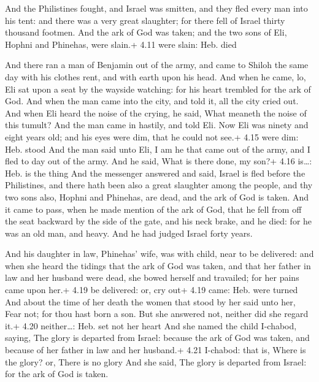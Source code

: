  And the Philistines fought, and Israel was smitten, and
they fled every man into his tent: and there was a very great slaughter;
for there fell of Israel thirty thousand footmen.  And the
ark of God was taken; and the two sons of Eli, Hophni and Phinehas, were
slain.+ 4.11 were slain: Heb. died

 And there ran a man of Benjamin out of the army, and
came to Shiloh the same day with his clothes rent, and with earth upon
his head.  And when he came, lo, Eli sat upon a seat by the
wayside watching: for his heart trembled for the ark of God. And when
the man came into the city, and told it, all the city cried out.
 And when Eli heard the noise of the crying, he said, What
meaneth the noise of this tumult? And the man came in hastily, and told
Eli.  Now Eli was ninety and eight years old; and his eyes
were dim, that he could not see.+ 4.15 were dim: Heb. stood
 And the man said unto Eli, I am he that came out of the
army, and I fled to day out of the army. And he said, What is there
done, my son?+ 4.16 is\ldots: Heb. is the thing  And the
messenger answered and said, Israel is fled before the Philistines, and
there hath been also a great slaughter among the people, and thy two
sons also, Hophni and Phinehas, are dead, and the ark of God is taken.
 And it came to pass, when he made mention of the ark of
God, that he fell from off the seat backward by the side of the gate,
and his neck brake, and he died: for he was an old man, and heavy. And
he had judged Israel forty years.

 And his daughter in law, Phinehas' wife, was with child,
near to be delivered: and when she heard the tidings that the ark of God
was taken, and that her father in law and her husband were dead, she
bowed herself and travailed; for her pains came upon her.+ 4.19 be
delivered: or, cry out+ 4.19 came: Heb. were turned  And
about the time of her death the women that stood by her said unto her,
Fear not; for thou hast born a son. But she answered not, neither did
she regard it.+ 4.20 neither\ldots: Heb. set not her heart 
And she named the child I-chabod, saying, The glory is departed from
Israel: because the ark of God was taken, and because of her father in
law and her husband.+ 4.21 I-chabod: that is, Where is the glory? or,
There is no glory  And she said, The glory is departed from
Israel: for the ark of God is taken.


